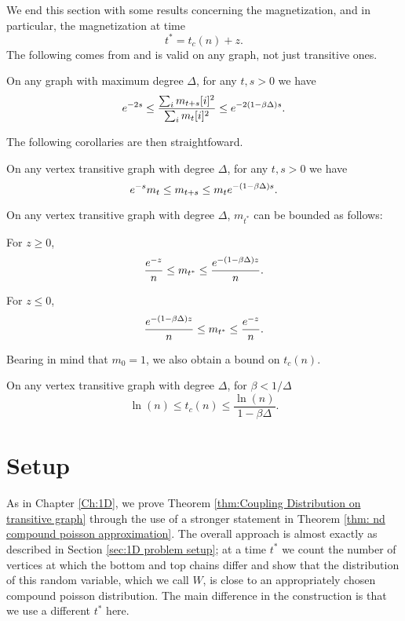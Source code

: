 We end this section with some results concerning the magnetization, and in particular, the magnetization at time
\begin{equation}
	t^* = t_c(n) + z.
\end{equation}
The following comes from \cite{Lubetzky2017-nc} and is valid on any graph, not just transitive ones.
\begin{lemma}
	On any graph with maximum degree $\Delta$, for any $t, s > 0$ we have
	\begin{equation}
		e^{-2s} \leq \frac{\sum_i m_{t+s}[i]^2}{\sum_i m_t[i]^2} \leq e^{-2(1 - \beta \Delta)s}.
	\end{equation}
\end{lemma}
The following corollaries are then straightfoward.
\begin{corollary}
	\label{cor:exponential decay magnetization}
	On any vertex transitive graph with degree $\Delta$, for any $t, s > 0$ we have
	\begin{equation}
		e^{-s} m_t \leq m_{t+s} \leq m_t e^{-(1 - \beta \Delta)s}.
	\end{equation}
\end{corollary}
\begin{corollary}
\label{cor:magnetization of t star}
	On any vertex transitive graph with degree $\Delta$, $m_{t^*}$ can be bounded as follows:

	For $z \geq 0$,
	\begin{equation}
		\frac{e^{-z}}{n} \leq m_{t^*} \leq \frac{e^{-(1 - \beta \Delta)z}}{n}.
	\end{equation}

	For $z \leq 0$,
	\begin{equation}
		\frac{e^{-(1 - \beta \Delta)z}}{n} \leq m_{t^*} \leq \frac{e^{-z}}{n}.
	\end{equation}
\end{corollary}
Bearing in mind that $m_0 = 1$, we also obtain a bound on $t_c(n)$.
\begin{corollary}
	On any vertex transitive graph with degree $\Delta$, for $\beta < 1/\Delta$
	\begin{equation}
		\ln(n) \leq t_c(n) \leq \frac{\ln(n)}{1 - \beta \Delta}.
	\end{equation}
\end{corollary}

\section{Setup}
\label{sec:nd problem setup}
As in Chapter \ref{Ch:1D}, we prove Theorem \ref{thm:Coupling Distribution on transitive graph} through the use of a stronger statement in Theorem \ref{thm: nd compound poisson approximation}. The overall approach is almost exactly as described in Section \ref{sec:1D problem setup}; at a time $t^*$ we count the number of vertices at which the bottom and top chains differ and show that the distribution of this random variable, which we call $W$, is close to an appropriately chosen compound poisson distribution. The main difference in the construction is that we use a different $t^*$ here.


